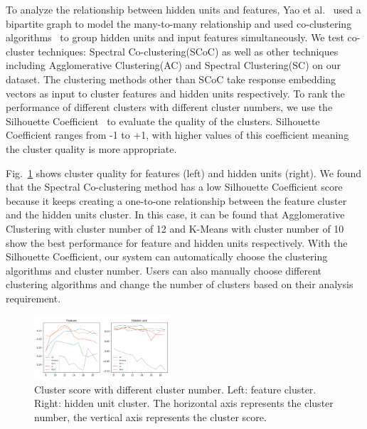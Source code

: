 To analyze the relationship between hidden units and features, Yao et al.~\cite{ming2017understanding} used a bipartite graph to model the many-to-many relationship and used co-clustering algorithms~\cite{dhillon2001co} to group hidden units and input features simultaneously. We test co-cluster techniques: Spectral Co-clustering(SCoC) as well as other techniques including Agglomerative Clustering(AC) and Spectral Clustering(SC) on our dataset. The clustering methods other than SCoC take response embedding vectors as input to cluster features and hidden units respectively. To rank the performance of different clusters with different cluster numbers, we use the Silhouette Coefficient~\cite{rousseeuw1987silhouettes} to evaluate the quality of the clusters. Silhouette Coefficient ranges from -1 to +1,  with higher values of this coefficient meaning the cluster quality is more appropriate. 


Fig.~\ref{fig:cluster_parameters} shows cluster quality for features (left) and hidden units (right). We found that the Spectral Co-clustering method has a low Silhouette Coefficient score because it keeps creating a one-to-one relationship between the feature cluster and the hidden units cluster. In this case, it can be found that Agglomerative Clustering with cluster number of 12 and K-Means with cluster number of 10 show the best performance for feature and hidden units respectively.
With the Silhouette Coefficient, our system can automatically choose the clustering algorithms and cluster number.
Users can also manually choose different clustering algorithms and change the number of clusters based on their analysis requirement.



\begin{figure}[t]
	\centering
	\includegraphics[width=0.45\textwidth]{pictures/methods/cluster_parameters.png}
	\vspace{-3mm}
	\caption{Cluster score with different cluster number. Left: feature cluster. Right: hidden unit cluster. The horizontal axis represents the cluster number, the vertical axis represents the cluster score. 
	}
	\label{fig:cluster_parameters}
	\vspace{-4mm}
\end{figure}

